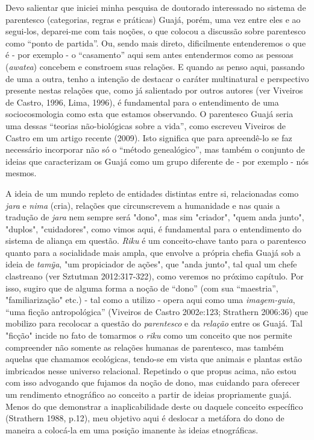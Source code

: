 Devo salientar que iniciei minha pesquisa de doutorado interessado no
sistema de parentesco (categorias, regras e práticas) Guajá, porém, uma
vez entre eles e ao segui-los, deparei-me com tais noções, o que colocou
a discussão sobre parentesco como ``ponto de partida''. Ou, sendo mais
direto, dificilmente entenderemos o que é - por exemplo - o
``casamento'' aqui sem antes entendermos como as pessoas (\emph{awatea})
concebem e constroem suas relações. E quando as penso aqui, passando de
uma a outra, tenho a intenção de destacar o caráter multinatural e
perspectivo presente nestas relações que, como já salientado por outros
autores (ver Viveiros de Castro, 1996, Lima, 1996), é fundamental para o
entendimento de uma sociocosmologia como esta que estamos observando. O
parentesco Guajá seria uma dessas ``teorias não-biológicas sobre a
vida'', como escreveu Viveiros de Castro em um artigo recente (2009).
Isto significa que para apreendê-lo se faz necessário incorporar não só
o ``método genealógico'', mas também o conjunto de ideias que
caracterizam os Guajá como um grupo diferente de - por exemplo - nós
mesmos.

A ideia de um mundo repleto de entidades distintas entre si,
relacionadas como \emph{jara} e \emph{nima} (cria), relações que
circunscrevem a humanidade e nas quais a tradução de \emph{jara} nem
sempre será "dono", mas sim "criador", "quem anda junto", "duplos",
"cuidadores", como vimos aqui, é fundamental para o entendimento do
sistema de aliança em questão. \emph{Riku} é um conceito-chave tanto
para o parentesco quanto para a socialidade mais ampla, que envolve a
própria chefia Guajá sob a ideia de \emph{tamỹa}, "um propiciador de
ações", que "anda junto", tal qual um chefe clastreano (ver Sztutman
2012:317-322), como veremos no próximo capítulo. Por isso, sugiro que de
alguma forma a noção de ``dono'' (com sua ``maestria'', "familiarização"
etc.) - tal como a utilizo - opera aqui como uma \emph{imagem-guia},
``uma ficção antropológica'' (Viveiros de Castro 2002e:123; Strathern
2006:36) que mobilizo para recolocar a questão do \emph{parentesco} e da
\emph{relação} entre os Guajá. Tal "ficção" incide no fato de tomarmos o
\emph{riku} como um conceito que nos permite compreender não somente as
relações humanas de parentesco, mas também aquelas que chamamos
ecológicas, tendo-se em vista que animais e plantas estão imbricados
nesse universo relacional. Repetindo o que propus acima, não estou com
isso advogando que fujamos da noção de dono, mas cuidando para oferecer
um rendimento etnográfico ao conceito a partir de ideias propriamente
guajá. Menos do que demonstrar a inaplicabilidade deste ou daquele
conceito específico (Strathern 1988, p.12), meu objetivo aqui é deslocar
a metáfora do dono de maneira a colocá-la em uma posição imanente às
ideias etnográficas.

